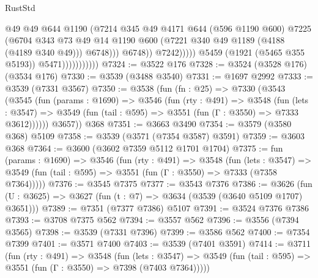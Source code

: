 \begin{lexlean}{RustStd}
\begin{coremodule}
                                          @49
                                          @49
                                          @644
                                          @1190
                                          (@7214
                                            @345
                                            @49
                                            @4171
                                            @644
                                            (@596 @1190 @600)
                                            @7225
                                            (@6704
                                              @343
                                              @73
                                              @49
                                              @14
                                              @1190
                                              @600
                                              (@7221 @340 @49 @1189 (@4188 (@4189 @340 @49)))
                                              @6748)))
                                        @6748))
                                    @7242)))))
                          @5459
                          (@1921 (@5465 @355 @5193))
                          @5471)))))))))))
@7324 := @3522 @176
@7328 := @3524 (@3528 @176) (@3534 @176)
@7330 := @3539 (@3488 @3540)
@7331 := @1697 @2992
@7333 := @3539 (@7331 @3567)
@7350 := @3538
    (fun (fn : @25) =>
    @7330
      (@3543
        (@3545
          (fun (params : @1690) =>
          @3546
            (fun (rty : @491) =>
            @3548
              (fun (lets : @3547) =>
              @3549 (fun (tail : @595) => @3551 (fun (Γ : @3550) => @7333 @3612))))))
        @3657))
    @368
@7351 := @3663 @3490
@7354 := @3579 (@3580 @368) @5109
@7358 := @3539 (@3571 (@7354 @3587) @3591)
@7359 := @3603 @368
@7364 := @3600 (@3602 @7359 @5112 @1701 @1704)
@7375 := fun (params : @1690) =>
  @3546
    (fun (rty : @491) =>
    @3548
      (fun (lets : @3547) =>
      @3549 (fun (tail : @595) => @3551 (fun (Γ : @3550) => @7333 (@7358 @7364)))))
@7376 := @3545 @7375
@7377 := @3543 @7376
@7386 := @3626 (fun (U : @3625) => @3627 (fun (t : @7) => @3634 (@3539 (@3640 @5109 @1707) @3651)))
@7389 := @7351 (@7377 @7386) @5107
@7391 := @3524 @7376 @7386
@7393 := @3708 @7375 @562
@7394 := @3557 @562
@7396 := @3556 (@7394 @3565)
@7398 := @3539 (@7331 @7396)
@7399 := @3586 @562
@7400 := @7354 @7399
@7401 := @3571 @7400
@7403 := @3539 (@7401 @3591)
@7414 := @3711
    (fun (rty : @491) =>
    @3548
      (fun (lets : @3547) =>
      @3549 (fun (tail : @595) => @3551 (fun (Γ : @3550) => @7398 (@7403 @7364)))))

\end{coremodule}
\end{lexlean}
